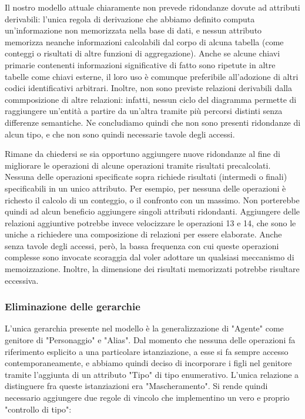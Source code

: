 \documentclass{article}
\begin{document}
Il nostro modello attuale chiaramente non prevede ridondanze dovute ad attributi
derivabili: l'unica regola di derivazione che abbiamo definito computa
un'informazione non memorizzata nella base di dati, e nessun attributo memorizza
neanche informazioni calcolabili dal corpo di alcuna tabella (come conteggi o
risultati di altre funzioni di aggregazione). Anche se alcune chiavi primarie
contenenti informazioni significative di fatto sono ripetute in altre tabelle
come chiavi esterne, il loro uso è comunque preferibile all'adozione di altri
codici identificativi arbitrari. Inoltre, non sono previste relazioni derivabili
dalla commposizione di altre relazioni: infatti, nessun ciclo del diagramma
permette di raggiungere un'entità a partire da un'altra tramite più percorsi
distinti senza differenze semantiche. Ne concludiamo quindi che non sono
presenti ridondanze di alcun tipo, e che non sono quindi necessarie tavole degli
accessi.

Rimane da chiedersi se sia opportuno aggiungere nuove ridondanze al fine di
migliorare le operazioni di alcune operazioni tramite risultati precalcolati.
Nessuna delle operazioni specificate sopra richiede risultati (intermedi o
finali) specificabili in un unico attributo. Per esempio, per nessuna delle
operazioni è richesto il calcolo di un conteggio, o il confronto con un massimo.
Non porterebbe quindi ad alcun beneficio aggiungere singoli attributi
ridondanti. Aggiungere delle relazioni aggiuntive potrebbe invece velocizzare
le operazioni 13 e 14, che sono le uniche a richiedere una composizione di
relazioni per essere elaborate. Anche senza tavole degli accessi, però, la bassa
frequenza con cui queste operazioni complesse sono invocate scoraggia dal
voler adottare un qualsiasi meccanismo di memoizzazione. Inoltre, la dimensione
dei risultati memorizzati potrebbe risultare eccessiva.

\subsubsection{Eliminazione delle gerarchie}

L'unica gerarchia presente nel modello è la generalizzazione di "Agente" come
genitore di "Personaggio" e "Alias". Dal momento che nessuna delle operazioni fa
riferimento esplicito a una particolare istanziazione, a esse si fa sempre
accesso contemporaneamente, e abbiamo quindi deciso di incorporare i figli nel
genitore tramite l'aggiunta di un attributo "Tipo" di tipo enumerativo. L'unica
relazione a distinguere fra queste istanziazioni era "Mascheramento". Si rende
quindi necessario aggiungere due regole di vincolo che implementino un vero e
proprio "controllo di tipo":
\end{document}
